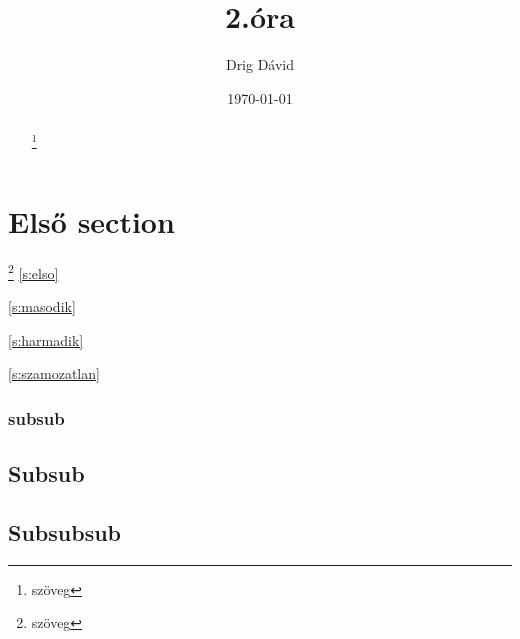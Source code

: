 \documentclass[12pt,twoside]{article}
\begin{document}
\pagestyle{fancy}
\setlength{\headheight}{52pt}


\renewcommand{\footrulewidth}{0.4pt}
\fancyhead[LE,RO]{\thepage}
\fancyhead[LO]{\leftmark}
\fancyhead[RE]{\rightmark}












\title{2.óra}
\author{Drig Dávid}
\date{\today}
\renewcommand{\thefootnote}{\fnsymbol{footnote}}
\maketitle



\begin{abstract}
\hulipsum[1]
\blindtext[1]
\footnote{szöveg}
\end{abstract}


\setcounter{tocdepth}{5} 
\tableofcontents
{}

\clearpage

\setcounter{secnumdepth}{5}

\section{Első section}\footnote{szöveg}
\autoref{s:elso}

\ref{s:masodik}

\ref{s:harmadik}


\pageref{s:masodik}

\pageref{s:harmadik}

\ref{s:szamozatlan}

\pageref{s:szamozatlan}

\subsubsection{subsub}
\subsection{Subsub}
\hulipsum
{}\label{s:elso}
\subsection{Subsubsub}
\hulipsum
\end{document}
